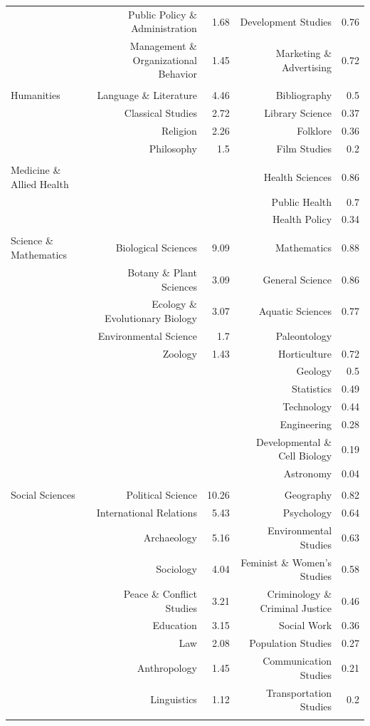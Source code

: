 \documentclass[]{book}
\theoremstyle{definition}
\theoremstyle{definition}
\theoremstyle{definition}
\theoremstyle{remark}
\begin{document}
\begin{table}[!htbp]
\begin{tabular}{@{\extracolsep{5pt}} lrrrr}
 & Public Policy \& Administration & 1.68 & Development Studies & 0.76 \\ 
 & Management \& Organizational Behavior & 1.45 & Marketing \& Advertising & 0.72 \\ 
 &  &  &  &  \\ 
Humanities & Language \& Literature & 4.46 & Bibliography & 0.5 \\ 
 & Classical Studies & 2.72 & Library Science & 0.37 \\ 
 & Religion & 2.26 & Folklore & 0.36 \\ 
 & Philosophy & 1.5 & Film Studies & 0.2 \\ 
 &  &  &  &  \\ 
Medicine \& Allied Health &  &  & Health Sciences & 0.86 \\ 
 &  &  & Public Health & 0.7 \\ 
 &  &  & Health Policy & 0.34 \\ 
 &  &  &  &  \\ 
Science \& Mathematics & Biological Sciences & 9.09 & Mathematics & 0.88 \\ 
 & Botany \& Plant Sciences & 3.09 & General Science & 0.86 \\ 
 & Ecology \& Evolutionary Biology & 3.07 & Aquatic Sciences & 0.77 \\ 
 & Environmental Science & 1.7 & Paleontology &  \\ 
 & Zoology & 1.43 & Horticulture & 0.72 \\ 
 &  &  & Geology & 0.5 \\ 
 &  &  & Statistics & 0.49 \\ 
 &  &  & Technology & 0.44 \\ 
 &  &  & Engineering & 0.28 \\ 
 &  &  & Developmental \& Cell Biology & 0.19 \\ 
 &  &  & Astronomy & 0.04 \\ 
 &  &  &  &  \\ 
Social Sciences & Political Science & 10.26 & Geography & 0.82 \\ 
 & International Relations & 5.43 & Psychology & 0.64 \\ 
 & Archaeology & 5.16 & Environmental Studies & 0.63 \\ 
 & Sociology & 4.04 & Feminist \& Women's Studies & 0.58 \\ 
 & Peace \& Conflict Studies & 3.21 & Criminology \& Criminal Justice & 0.46 \\ 
 & Education & 3.15 & Social Work & 0.36 \\ 
 & Law & 2.08 & Population Studies & 0.27 \\ 
 & Anthropology & 1.45 & Communication Studies & 0.21 \\ 
 & Linguistics & 1.12 & Transportation Studies & 0.2 \\ 
\hline \\[-1.8ex] 
\end{tabular} 
\end{table}
\end{document}

